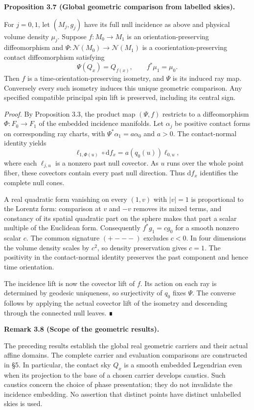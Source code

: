 \documentclass[
  english,
  11pt,
  reqno]{amsart}
\makeatletter
\newcommand{\pandocstatementheading}[1]{%
  \par\if@nobreak\else
    \addpenalty{\@beginparpenalty}%
    \addvspace{.5\baselineskip plus .2\baselineskip minus .2\baselineskip}%
  \fi
  {\normalfont\bfseries #1\par}%
  \nobreak\@afterindenttrue\@afterheading
}
\makeatother
\begin{document}
\pandocstatementheading{\protect{}\label{prop:global-geometric-recognition}Proposition 3.7 (Global geometric comparison from labelled skies).}

For \(j=0,1\), let \((M_j,g_j)\) have its full null incidence as above
and physical volume density \(\mu_j\). Suppose \(f:M_0\to M_1\) is an
orientation-preserving diffeomorphism and
\(\Psi:\mathcal N(M_0)\to\mathcal N(M_1)\) is a coorientation-preserving
contact diffeomorphism satisfying \[
\Psi(Q_x)=Q_{f(x)},\qquad f^*\mu_1=\mu_0.
\] Then \(f\) is a time-orientation-preserving isometry, and \(\Psi\) is
its induced ray map. Conversely every such isometry induces this unique
geometric comparison. Any specified compatible principal spin lift is
preserved, including its central sign.

\emph{Proof.} By Proposition 3.3, the product map \((\Psi,f)\) restricts
to a diffeomorphism \(\Phi:F_0\to F_1\) of the embedded incidence
manifolds. Let \(\alpha_j\) be positive contact forms on corresponding
ray charts, with \(\Psi^*\alpha_1=a\alpha_0\) and \(a>0\). The
contact-normal identity yields \[
\ell_{1,\Phi(u)}\circ\mathrm df_x
=a(q_0(u))\ell_{0,u},
\] where each \(\ell_{j,u}\) is a nonzero past null covector. As \(u\)
runs over the whole point fiber, these covectors contain every past null
direction. Thus \(\mathrm df_x\) identifies the complete null cones.

A real quadratic form vanishing on every \((1,v)\) with \(|v|=1\) is
proportional to the Lorentz form: comparison at \(v\) and \(-v\) removes
its mixed terms, and constancy of its spatial quadratic part on the
sphere makes that part a scalar multiple of the Euclidean form.
Consequently \(f^*g_1=cg_0\) for a smooth nonzero scalar \(c\). The
common signature \((+---)\) excludes \(c<0\). In four dimensions the
volume density scales by \(c^2\), so density preservation gives \(c=1\).
The positivity in the contact-normal identity preserves the past
component and hence time orientation.

The incidence lift is now the covector lift of \(f\). Its action on each
ray is determined by geodesic uniqueness, so surjectivity of \(q_0\)
fixes \(\Psi\). The converse follows by applying the actual covector
lift of the isometry and descending through the connected null leaves. ∎

\pandocstatementheading{\protect{}\label{rem:global-geometry-proof-scope}Remark 3.8 (Scope of the geometric results).}

The preceding results establish the global real geometric carriers and
their actual affine domains. The complete carrier and evaluation
comparisons are constructed in §5. In particular, the contact sky
\(Q_x\) is a smooth embedded Legendrian even when its projection to the
base of a chosen carrier develops caustics. Such caustics concern the
choice of phase presentation; they do not invalidate the incidence
embedding. No assertion that distinct points have distinct unlabelled
skies is used.
\end{document}
